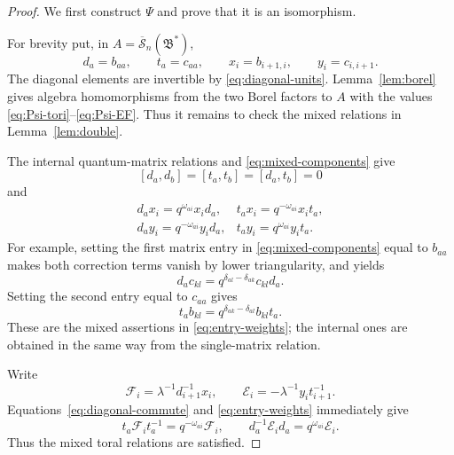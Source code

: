 \documentclass[11pt]{article}
\theoremstyle{remark}
\newcommand{\rSk}{\overline{\mathscr S}_n}
\newcommand{\Bstar}{\mathfrak B^{*}}
\begin{document}
\begin{proof}
We first construct $\Psi$ and prove that it is an isomorphism.

For brevity put, in $A=\rSk(\Bstar)$,
\[
 d_a=b_{aa},\qquad t_a=c_{aa},\qquad
 x_i=b_{i+1,i},\qquad y_i=c_{i,i+1}.
\]
The diagonal elements are invertible by
\eqref{eq:diagonal-units}.  Lemma~\ref{lem:borel} gives algebra
homomorphisms from the two Borel factors to $A$ with the values
\eqref{eq:Psi-tori}--\eqref{eq:Psi-EF}.  Thus it remains to check the
mixed relations in Lemma~\ref{lem:double}.

The internal quantum-matrix relations and
\eqref{eq:mixed-components} give
\begin{equation}\label{eq:diagonal-commute}
 [d_a,d_b]=[t_a,t_b]=[d_a,t_b]=0
\end{equation}
and
\begin{equation}\label{eq:entry-weights}
 \begin{array}{ll}
 d_ax_i=q^{\omega_{ai}}x_id_a,
   & t_ax_i=q^{-\omega_{ai}}x_it_a,\\[2pt]
 d_ay_i=q^{-\omega_{ai}}y_id_a,
   & t_ay_i=q^{\omega_{ai}}y_it_a.
 \end{array}
\end{equation}
For example, setting the first matrix entry in
\eqref{eq:mixed-components} equal to $b_{aa}$ makes both correction
terms vanish by lower triangularity, and yields
\[
 d_ac_{kl}=q^{\delta_{al}-\delta_{ak}}c_{kl}d_a.
\]
Setting the second entry equal to $c_{aa}$ gives
\[
 t_ab_{kl}=q^{\delta_{ak}-\delta_{al}}b_{kl}t_a.
\]
These are the mixed assertions in \eqref{eq:entry-weights}; the
internal ones are obtained in the same way from the single-matrix
relation.

Write
\[
 \mathcal F_i=\lambda^{-1}d_{i+1}^{-1}x_i,
 \qquad
 \mathcal E_i=-\lambda^{-1}y_it_{i+1}^{-1}.
\]
Equations~\eqref{eq:diagonal-commute} and
\eqref{eq:entry-weights} immediately give
\[
 t_a\mathcal F_it_a^{-1}=q^{-\omega_{ai}}\mathcal F_i,
 \qquad
 d_a^{-1}\mathcal E_id_a=q^{\omega_{ai}}\mathcal E_i.
\]
Thus the mixed toral relations are satisfied.


\end{proof}
\end{document}
